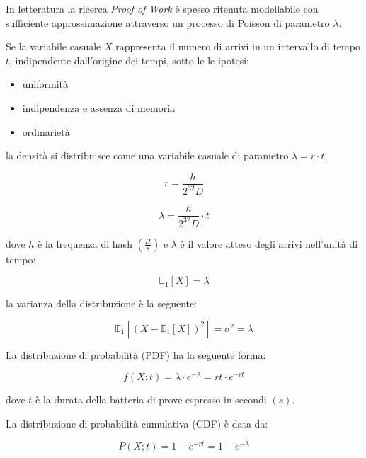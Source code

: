 \documentclass{book}
\theoremstyle{definition}
\begin{document}
In letteratura la ricerca \textit{Proof of Work} è spesso ritenuta modellabile con sufficiente approssimazione attraverso un processo di Poisson di parametro $\lambda$.

Se la variabile casuale $X$ rappresenta il numero di arrivi in un intervallo di tempo $t$, indipendente dall'origine dei tempi, sotto le le ipotesi:

\begin{itemize}
    \item uniformità
    \item indipendenza e assenza di memoria
    \item ordinarietà
\end{itemize}

la densità si distribuisce come una variabile casuale di parametro $\lambda = r \cdot t$.

\begin{equation}
    r = \frac{h}{2^{32}D} \label{rate}
\end{equation}

\begin{equation}
    \lambda = \frac{h}{2^{32}D} \cdot t \label{lambda}
\end{equation}

dove $h$ è la frequenza di hash $(\frac{H}{s})$ e $\lambda$ è il valore atteso degli arrivi nell'unità di tempo:

\begin{equation}
    \mathbb{E}_{1}[X] = \lambda \label{E_lambda}
\end{equation}

la varianza della distribuzione è la seguente:

\begin{equation}
    \mathbb{E}_{1}[ ( X - \mathbb{E}_{1}[X] )^2 ] = \sigma^{2} = \lambda \label{sigma2_lambda}
\end{equation}

La distribuzione di probabilità (PDF) ha la seguente forma:

\begin{equation}
    f(X; t) = \lambda \cdot e^{-\lambda} = rt \cdot e^{-rt}
\end{equation}

dove $t$ è la durata della batteria di prove espresso in  secondi $(s)$.

La distribuzione di probabilità cumulativa (CDF) è data da:

\begin{equation}
    P(X; t) = 1 - e^{-rt} = 1 - e^{-\lambda} \label{eq:CDF}
\end{equation}
\end{document}
